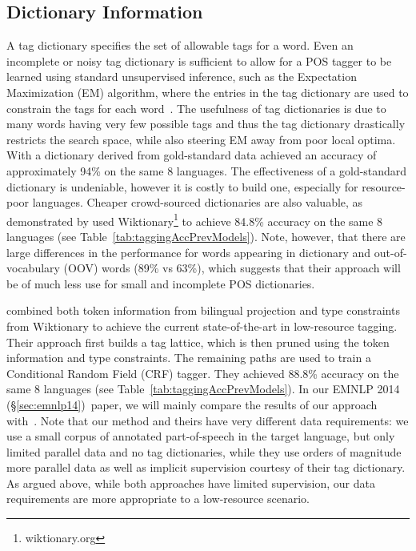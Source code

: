 \documentclass[12pt,twoside,final,hidelinks]{ltthesis}
\theoremstyle{definition}
\newcommand\emnlpiv{EMNLP 2014 (\S\ref{sec:emnlp14})}
\begin{document}
\subsection{Dictionary Information}
A tag dictionary specifies the set of allowable tags for a word. Even an incomplete or noisy tag dictionary is sufficient to allow for a POS tagger to be learned using standard unsupervised inference, such as the Expectation Maximization (EM) algorithm, where the entries in the tag dictionary are used to constrain the tags for each word~\cite{Kupiec1992225,Merialdo:1994,Banko:2004,Goldberg08emcan}. The usefulness of tag dictionaries is due to many words having very few possible tags and thus the tag dictionary drastically restricts the search space, while also steering EM away from poor local optima.
With a dictionary derived from gold-standard data  achieved an accuracy of approximately 94\% on the same 8 languages. The effectiveness of a gold-standard dictionary is undeniable, however it is costly to build one, especially for resource-poor languages. Cheaper crowd-sourced dictionaries are also valuable, as demonstrated by  used Wiktionary\footnote{wiktionary.org} to achieve 84.8\% accuracy on the same 8 languages (see Table~\ref{tab:taggingAccPrevModels}). Note, however, that there are large differences in the performance for words appearing in dictionary and out-of-vocabulary (OOV) words (89\% vs 63\%), which suggests that their approach will be of much less use for small and incomplete POS dictionaries. 

 combined both token information from bilingual projection and type 
constraints from Wiktionary to achieve the current state-of-the-art in low-resource tagging. 
Their approach first builds a tag lattice, which is then pruned using the token information 
and type constraints. The remaining paths are used to train a Conditional Random Field (CRF) 
tagger. They achieved 88.8\% accuracy on the same 8 languages (see 
Table~\ref{tab:taggingAccPrevModels}). In our \emnlpiv\ paper, we will mainly compare the 
results of our approach with~. Note that our method and theirs have 
very different data requirements: we use a small corpus of annotated part-of-speech in the 
target language, but only limited parallel data and no tag dictionaries, while they use orders 
of magnitude more parallel data as well as implicit supervision courtesy of their tag 
dictionary. As argued above, while both approaches have limited supervision, our data 
requirements are more appropriate to a low-resource scenario. 
\end{document}
